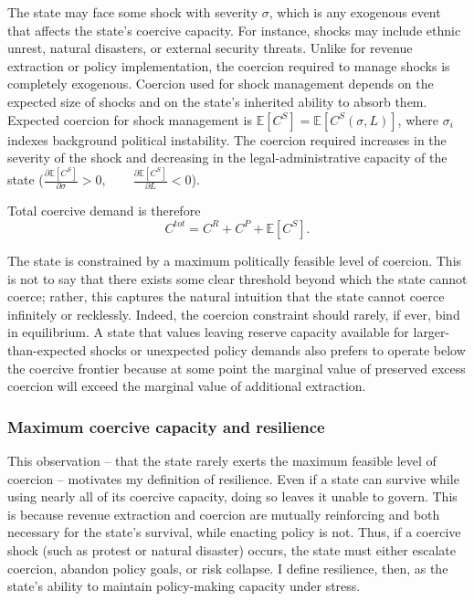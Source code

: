 \documentclass[12pt]{article}
\newcommand{\E}{\mathbb{E}}
\begin{document}
The state may face some shock with severity $\sigma$, which is any exogenous event that affects the state's coercive capacity. For instance, shocks may include ethnic unrest, natural disasters, or external security threats. Unlike for revenue extraction or policy implementation, the coercion required to manage shocks is completely exogenous. Coercion used for shock management depends on the expected size of shocks and on the state's inherited ability to absorb them. Expected coercion for shock management is $\E[C^S] = \E[C^S(\sigma,L)]$, where $\sigma_i$ indexes background political instability. The coercion required increases in the severity of the shock and decreasing in the legal-administrative capacity of the state ($\frac{\partial \E[C^S]}{\partial \sigma} > 0, \qquad \frac{\partial \E[C^S]}{\partial L} < 0$).

Total coercive demand is therefore
\begin{equation}
C^{tot} = C^R + C^P + \E[C^S].
\end{equation}

The state is constrained by a maximum politically feasible level of coercion. This is not to say that there exists some clear threshold beyond which the state cannot coerce; rather, this captures the natural intuition that the state cannot coerce infinitely or recklessly. Indeed, the coercion constraint should rarely, if ever, bind in equilibrium. A state that values leaving reserve capacity available for larger-than-expected shocks or unexpected policy demands also prefers to operate below the coercive frontier because at some point the marginal value of preserved excess coercion will exceed the marginal value of additional extraction.

\subsubsection{Maximum coercive capacity and resilience}\label{section:resiliencedef}

This observation -- that the state rarely exerts the maximum feasible level of coercion -- motivates my definition of resilience. Even if a state can survive while using nearly all of its coercive capacity, doing so leaves it unable to govern. This is because revenue extraction and coercion are mutually reinforcing and both necessary for the state's survival, while enacting policy is not. Thus, if a coercive shock (such as protest or natural disaster) occurs, the state must either escalate coercion, abandon policy goals, or risk collapse. I define resilience, then, as the state’s ability to maintain policy-making capacity under stress.
\end{document}
